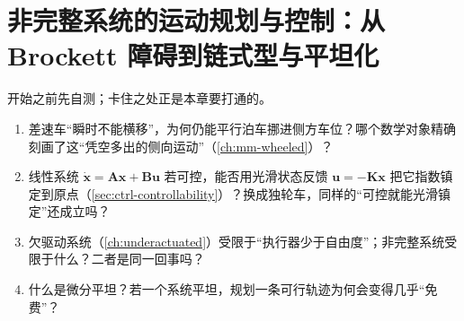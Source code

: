 \chapter{非完整系统的运动规划与控制：从 Brockett 障碍到链式型与平坦化}
\label{ch:nonholonomic}


\begin{practice}[前置自测]
开始之前先自测；卡住之处正是本章要打通的。
\begin{enumerate}
  \item 差速车“瞬时不能横移”，为何仍能平行泊车挪进侧方车位？哪个数学对象精确刻画了这“凭空多出的侧向运动”（\cref{ch:mm-wheeled}）？
  \item 线性系统 $\dot{\mathbf{x}}=\mathbf{A}\mathbf{x}+\mathbf{B}\mathbf{u}$ 若可控，能否用光滑状态反馈 $\mathbf{u}=-\mathbf{K}\mathbf{x}$ 把它指数镇定到原点（\cref{sec:ctrl-controllability}）？换成独轮车，同样的“可控就能光滑镇定”还成立吗？
  \item 欠驱动系统（\cref{ch:underactuated}）受限于“执行器少于自由度”；非完整系统受限于什么？二者是同一回事吗？
  \item 什么是微分平坦？若一个系统平坦，规划一条可行轨迹为何会变得几乎“免费”？
\end{enumerate}
\end{practice}

